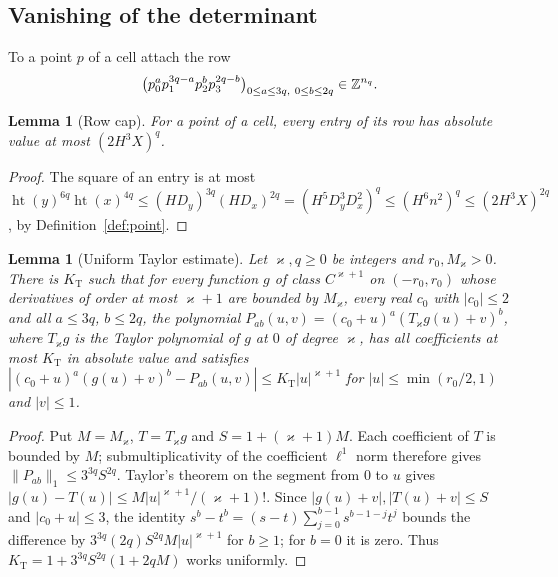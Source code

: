 \documentclass[11pt,reqno]{amsart}
\newtheorem{lemma}[theorem]{Lemma}
\theoremstyle{definition}
\theoremstyle{remark}
\numberwithin{equation}{section}
\newcommand{\hgt}{\operatorname{ht}}
\begin{document}
\subsection{Vanishing of the determinant}
To a point $p$ of a cell attach the row
\[
 \bigl(p_0^ap_1^{3q-a}p_2^bp_3^{2q-b}\bigr)_{0\le a\le3q,\ 0\le b\le2q}\in\mathbb Z^{n_q}.
\]
\begin{lemma}[Row cap]\label{lem:rowcap}
For a point of a cell, every entry of its row has absolute value at most
$(2H^3X)^q$.
\end{lemma}
\begin{proof}
The square of an entry is at most
$\hgt(y)^{6q}\hgt(x)^{4q}\le(HD_y)^{3q}(HD_x)^{2q}=(H^5D_y^3D_x^2)^q
\le(H^6n^2)^q\le(2H^3X)^{2q}$, by Definition~\ref{def:point}.
\end{proof}

\begin{lemma}[Uniform Taylor estimate]\label{lem:taylor}
Let $\varkappa,q\ge0$ be integers and $r_0,M_\varkappa>0$. There is $K_{\mathrm T}$ such
that for every function $g$ of class $C^{\varkappa+1}$ on $(-r_0,r_0)$ whose
derivatives of order at most $\varkappa+1$ are bounded by $M_\varkappa$, every real $c_0$
with $|c_0|\le2$ and all $a\le3q$, $b\le2q$, the polynomial
$P_{ab}(u,v)=(c_0+u)^a(T_\varkappa g(u)+v)^b$, where $T_\varkappa g$ is the Taylor polynomial
of $g$ at $0$ of degree $\varkappa$, has all coefficients at most $K_{\mathrm T}$ in
absolute value and satisfies
$|(c_0+u)^a(g(u)+v)^b-P_{ab}(u,v)|\le K_{\mathrm T}|u|^{\varkappa+1}$ for
$|u|\le\min(r_0/2,1)$ and $|v|\le1$.
\end{lemma}
\begin{proof}
Put $M=M_\varkappa$, $T=T_\varkappa g$ and
$S=1+(\varkappa+1)M$. Each coefficient of $T$ is bounded by $M$;
submultiplicativity of the coefficient $\ell^1$ norm therefore gives
$\|P_{ab}\|_1\le3^{3q}S^{2q}$. Taylor's theorem on the segment from
$0$ to $u$ gives $|g(u)-T(u)|\le M|u|^{\varkappa+1}/(\varkappa+1)!$.
Since $|g(u)+v|,|T(u)+v|\le S$ and $|c_0+u|\le3$, the identity
$s^b-t^b=(s-t)\sum_{j=0}^{b-1}s^{b-1-j}t^j$ bounds the difference
by $3^{3q}(2q)S^{2q}M|u|^{\varkappa+1}$ for $b\ge1$; for $b=0$
it is zero. Thus $K_{\mathrm T}=1+3^{3q}S^{2q}(1+2qM)$ works uniformly.
\end{proof}
\end{document}
